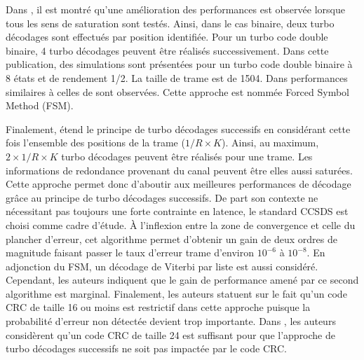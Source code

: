 Dans \cite{fsm}, il est montré qu'une amélioration des performances est observée lorsque tous les sens de 
saturation sont testés. Ainsi, dans le cas binaire, deux turbo décodages sont effectués par position identifiée. Pour 
un turbo code double binaire, 4 turbo décodages peuvent être réalisés successivement. Dans cette publication, des 
simulations sont présentées pour un turbo code double binaire à 8 états et de rendement 1/2. La taille de trame est 
de 1504. Dans performances similaires à celles de \cite{cim} sont observées. Cette approche est nommée
Forced Symbol Method (FSM).

Finalement, \cite{pflet} étend le principe de turbo décodages successifs en considérant cette fois l'ensemble des positions de la trame ($1/R\times K$). 
Ainsi, au maximum, $2\times 1/R\times K$ turbo décodages peuvent être réalisés pour une trame. Les informations
de redondance provenant du canal peuvent être elles aussi saturées. Cette approche permet donc d'aboutir aux meilleures
performances de décodage grâce au principe de turbo décodages successifs. De part son contexte ne nécessitant pas toujours 
une forte contrainte en latence, le standard CCSDS est choisi comme cadre d'étude. À l'inflexion entre la zone de convergence 
et celle du plancher d'erreur, cet algorithme permet d'obtenir un 
gain de deux ordres de magnitude faisant passer le taux d'erreur trame d'environ $10^{-6}$ à $10^{-8}$. En adjonction du 
FSM, un décodage de Viterbi par liste est aussi considéré. Cependant, les auteurs indiquent que 
le gain de performance amené par ce second algorithme est marginal. Finalement, les auteurs statuent sur 
le fait qu'un code CRC de taille 16 ou moins est restrictif dans cette approche puisque la probabilité d'erreur non 
détectée devient trop importante. Dans \cite{fsm}, les auteurs considèrent qu'un code CRC de taille 24 est suffisant pour 
que l'approche de turbo décodages successifs ne soit pas impactée par le code CRC.

